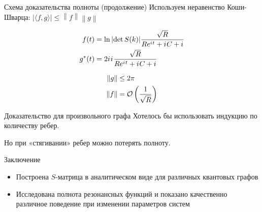 \documentclass{beamer}
\newcommand{\eexp}[1]{e^{#1}}
\begin{document}
\begin{frame}{Схема доказательства полноты (продолжение)}
Используем неравенство Коши-Шварца: $\big| \langle f,g \rangle \big| \leq \left\|f\right\| \left\|g\right\|$

\begin{align*}
f(t)   &= \ln \abs{\det S(k)} \frac{\sqrt{R}}{R \eexp{\iu t} + \iu C + i} \\
g^*(t) &= 2 \iu \iu \frac{\sqrt{R}}{R \eexp{\iu t} + \iu C + i}
\end{align*}

\begin{align*}
\norm{g} &\le 2 \pi \\
\norm{f} &= \mathcal{O}\left(\frac{1}{\sqrt{R}}\right)
\end{align*}
\end{frame}

\begin{frame}{Доказательство для произвольного графа}
Хотелось бы использовать индукцию по количеству ребер.

Но при «стягивании» ребер можно потерять полноту. %
\end{frame}



\begin{frame}{Заключение}
\begin{itemize}
\item Построена $S$-матрица в аналитическом виде для различных квантовых графов
\item Исследована полнота резонансных функций и показано качественно различное поведение при изменении параметров систем
\end{itemize}
\end{frame}


\end{document}
